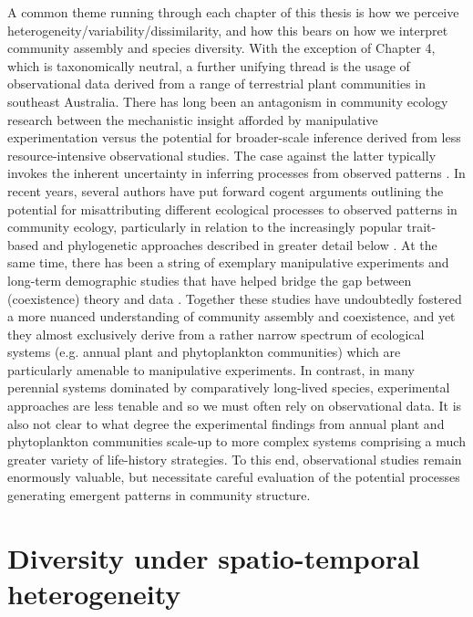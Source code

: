 A common theme running through each chapter of this thesis is how we perceive heterogeneity/variability/dissimilarity, and how this bears on how we interpret community assembly and species diversity. With the exception of Chapter 4, which is taxonomically neutral, a further unifying thread is the usage of observational data derived from a range of terrestrial plant communities in southeast Australia. There has long been an antagonism in community ecology research between the mechanistic insight afforded by manipulative experimentation versus the potential for broader-scale inference derived from less resource-intensive observational studies. The case against the latter typically invokes the inherent uncertainty in inferring processes from observed patterns \citep{weiher2001, Gotelli2006, Vellend2014}. In recent years, several authors have put forward cogent arguments outlining the potential for misattributing different ecological processes to observed patterns in community ecology, particularly in relation to the increasingly popular trait-based and phylogenetic approaches described in greater detail below \citep{Cavender-Bares2009, Mayfield2010, Fox2012a, Adler2013, Kraft2014}. At the same time, there has been a string of exemplary manipulative experiments and long-term demographic studies that have helped bridge the gap between (coexistence) theory and data \citep{Adler2006, Angert2009, Levine2009, Adler2010, Narwani2013, Fritschie2013, Godoy2014, Alexandrou2015, Kraft2015}. Together these studies have undoubtedly fostered a more nuanced understanding of community assembly and coexistence, and yet they almost exclusively derive from a rather narrow spectrum of ecological systems (e.g. annual plant and phytoplankton communities) which are particularly amenable to manipulative experiments. In contrast, in many perennial systems dominated by comparatively long-lived species, experimental approaches are less tenable and so we must often rely on observational data. It is also not clear to what degree the experimental findings from annual plant and phytoplankton communities scale-up to more complex systems comprising a much greater variety of life-history strategies. To this end, observational studies remain enormously valuable, but necessitate careful evaluation of the potential processes generating emergent patterns in community structure.

\section{Diversity under spatio-temporal heterogeneity}

